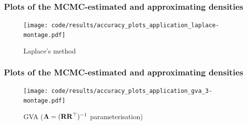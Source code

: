 \documentclass{beamer}
\begin{document}
	\begin{frame}
		\frametitle{Plots of the MCMC-estimated and approximating densities}
		\begin{figure}
			\caption{Laplace's method}
			\texttt{[image: code/results/accuracy\_plots\_application\_laplace-montage.pdf]}
		\end{figure}
	\end{frame}
		
	\begin{frame}
		\frametitle{Plots of the MCMC-estimated and approximating densities}
		\begin{figure}
			\caption{GVA (${\boldsymbol \Lambda}=({\bf R} {\bf R}^\top)^{-1}$ parameterisation)}
			\texttt{[image: code/results/accuracy\_plots\_application\_gva\_3-montage.pdf]}
		\end{figure}
	\end{frame}
		
		
		
\end{document}
